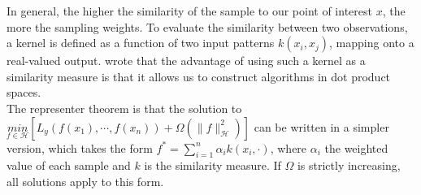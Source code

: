 In general, the higher the similarity of the sample to our point of interest $x$, the more the sampling weights. To evaluate the similarity between two observations, 
a kernel is defined as a function of two input patterns $k(x_i, x_j)$, mapping onto a real-valued output. \citet{hofmann2008kernel} wrote that the advantage of using such a kernel as a similarity measure is that it allows us to construct algorithms in dot product spaces.\\
The representer theorem is that the solution to $\underset{f\in\mathcal{H}}{min}[L_y(f(x_1),\cdots,f(x_n))+\Omega(\parallel f \parallel_\mathcal{H}^2)]$ can 
be written in a simpler version, which takes the form $f^{*}=\sum_{i=1}^n\alpha_i k(x_i,\cdot)$, where $\alpha_i$ the weighted value of each sample and $k$ is the similarity measure. If $\Omega$ is strictly increasing, all solutions apply to this form. 


